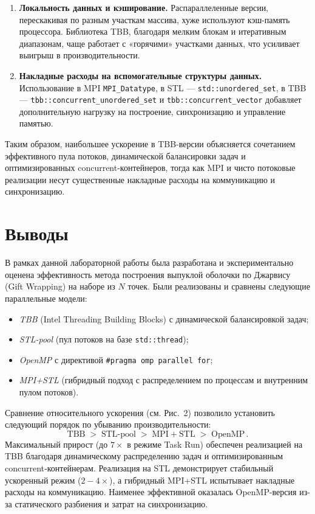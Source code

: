 \documentclass[12pt,a4paper]{article}
\begin{document}
\begin{enumerate}
  \item \textbf{Локальность данных и кэширование.}  
    Распараллеленные версии, перескакивая по разным участкам массива, хуже используют кэш-память процессора. Библиотека TBB, благодаря мелким блокам и итеративным диапазонам, чаще работает с «горячими» участками данных, что усиливает выигрыш в производительности.

  \item \textbf{Накладные расходы на вспомогательные структуры данных.}  
    Использование в MPI \texttt{MPI\_Datatype}, в STL — \texttt{std::unordered\_set}, в TBB — \texttt{tbb::concurrent\_unordered\_set} и \texttt{tbb::concurrent\_vector} добавляет дополнительную нагрузку на построение, синхронизацию и управление памятью.
\end{enumerate}

Таким образом, наибольшее ускорение в TBB-версии объясняется сочетанием эффективного пула потоков, динамической балансировки задач и оптимизированных concurrent-контейнеров, тогда как MPI и чисто потоковые реализации несут существенные накладные расходы на коммуникацию и синхронизацию.

\section{Выводы}
В рамках данной лабораторной работы была разработана и экспериментально оценена эффективность метода построения выпуклой оболочки по Джарвису (Gift Wrapping) на наборе из \(N\) точек. Были реализованы и сравнены следующие параллельные модели:
\begin{itemize}
  \item \emph{TBB} (Intel Threading Building Blocks) с динамической балансировкой задач;
  \item \emph{STL-pool} (пул потоков на базе \texttt{std::thread});
  \item \emph{OpenMP} с директивой \texttt{\#pragma omp parallel for};
  \item \emph{MPI+STL} (гибридный подход с распределением по процессам и внутренним пулом потоков).
\end{itemize}

Сравнение относительного ускорения (см. Рис.~2) позволило установить следующий порядок по убыванию производительности:
\[
\mathrm{TBB} \;>\; \mathrm{STL\mbox{-}pool} \;>\; \mathrm{MPI+STL} \;>\; \mathrm{OpenMP}\,.
\]
Максимальный прирост (до \(7\times\) в режиме Task Run) обеспечен реализацией на TBB благодаря динамическому распределению задач и оптимизированным concurrent‐контейнерам. Реализация на STL демонстрирует стабильный ускоренный режим (\(2\!-\!4\times\)), а гибридный MPI+STL испытывает накладные расходы на коммуникацию. Наименее эффективной оказалась OpenMP-версия из-за статического разбиения и затрат на синхронизацию.
\end{document}
